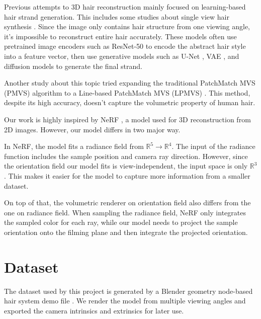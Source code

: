 \documentclass{article}
\begin{document}
Previous attempts to 3D hair reconstruction mainly focused on learning-based hair strand generation. This includes some studies about single view hair synthesis \cite{saito_3d_2018, zheng_hairstep_2023, wu_neuralhdhair_2022, ma_single-view_nodate}. Since the image only contains hair structure from one viewing angle, it's impossible to reconstruct entire hair accurately. These models often use pretrained image encoders such as ResNet-50 \cite{saito_3d_2018} to encode the abstract hair style into a feature vector, then use generative models such as U-Net \cite{zheng_hairstep_2023}, VAE \cite{saito_3d_2018}, and diffusion models \cite{sklyarova_neural_2023} to generate the final strand.


Another study about this topic tried expanding the traditional PatchMatch MVS (PMVS) algorithm to a Line-based PatchMatch MVS (LPMVS) \cite{nam_strand-accurate_nodate}. This method, despite its high accuracy, doesn't capture the volumetric property of human hair.

Our work is highly inspired by NeRF \cite{mildenhall_nerf_2020}, a model used for 3D reconstruction from 2D images. However, our model differs in two major way.

In NeRF, the model fits a radiance field from $\mathbb{R}^{5} \rightarrow \mathbb{R}^{4}$. The input of the radiance function includes the sample position and camera ray direction. However, since the orientation field our model fits is view-independent, the input space is only $\mathbb{R}^{3}$. This makes it easier for the model to capture more information from a smaller dataset.

On top of that, the volumetric renderer on orientation field also differs from the one on radiance field. When sampling the radiance field, NeRF only integrates the sampled color for each ray, while our model needs to project the sample orientation onto the filming plane and then integrate the projected orientation.


\section{Dataset}


The dataset used by this project is generated by a Blender geometry node-based hair system demo file \cite{foundation_blender_nodate}. We render the model from multiple viewing angles and exported the camera intrinsics and extrinsics for later use.
\end{document}

